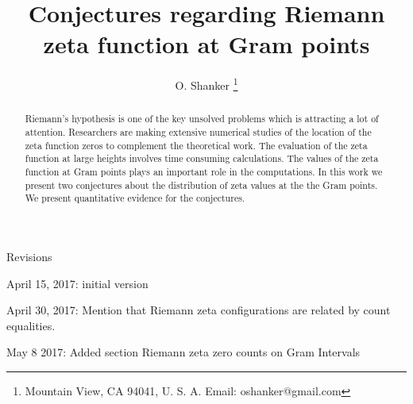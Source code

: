 \documentclass[twoside]{article}
\begin{document}
\date{}
\lhead[]{}
\rhead[]{}

\title{\bf{Conjectures regarding Riemann zeta function at Gram points}}


\author{O. Shanker 
 \thanks{Mountain View, CA 94041, U. S. A. Email: oshanker@gmail.com
 }
}

\maketitle
\thispagestyle{fancy}

\begin{abstract}
Riemann's hypothesis is one of the key unsolved problems which is attracting
a lot of attention. 
Researchers are making extensive numerical studies of the location of the 
zeta function zeros to complement the theoretical work. 
The evaluation of the zeta function at large heights involves time consuming
calculations. The values of the 
zeta function at Gram points plays an important role in the computations. In 
this work we present two conjectures about the distribution of zeta values at the 
the Gram points. We present quantitative evidence for the conjectures.
\end{abstract}

Revisions

April 15, 2017: initial version

April 30, 2017: Mention that Riemann zeta configurations are related by count equalities.

May 8 2017: Added section Riemann zeta zero counts on Gram Intervals



\clearpage
{}
\end{document}
